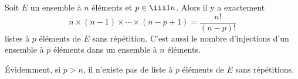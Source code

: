 \documentclass[french,11pt,twoside]{VcCours}
\begin{document}
\begin{Demonstration}{} 

%
\end{Demonstration}
 
%
%



\begin{Proposition}{}
Soit $E$ un ensemble à $n$ éléments et $p \in \iii 1n$. Alors il y a exactement 
\[  n \times (n-1) \times \cdots \times (n-p+1)  = \frac{n!}{(n-p)!} \]
listes à $p$ éléments de $E$ sans répétition. C'est aussi le nombre d'injections d'un ensemble à $p$ éléments dans un ensemble à $n$ éléments.
\end{Proposition}

\begin{Demonstration}{} 
\vspace{7cm}
\end{Demonstration}

\begin{Remarque}{} 
Évidemment, si $p>n$, il n'existe pas de liste à $p$ éléments de $E$ sans répétitions.
\end{Remarque}
%
%
\end{document}
